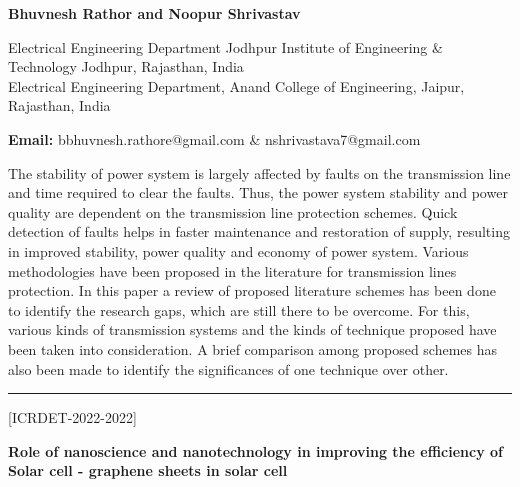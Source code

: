 \documentclass[twoside,11pt]{amsart}
\begin{document}
\centerline{\textbf{Bhuvnesh Rathor and Noopur Shrivastav }}
\vskip 5mm
\begin{flushleft}
Electrical Engineering Department
Jodhpur Institute of Engineering \& Technology Jodhpur, Rajasthan, India\\Electrical Engineering Department,
Anand College of Engineering, Jaipur, Rajasthan, India
\vskip 5mm
\end{flushleft}
\vskip 2mm
\begin{flushleft}
{\bf Email:} bbhuvnesh.rathore@gmail.com \& nshrivastava7@gmail.com
\end{flushleft}
\vskip 5mm
The stability of power system is largely affected by faults on the transmission line and time required to clear the faults. Thus, the power system stability and power quality are dependent on the transmission line protection schemes. Quick detection of faults helps in faster maintenance and restoration of supply, resulting in improved stability, power quality and economy of power system. Various methodologies have been proposed in the literature for transmission lines protection. In this paper a review of proposed literature schemes has been done to identify the research gaps, which are still there to be overcome. For this, various kinds of transmission systems and the kinds of technique proposed have been taken into consideration. A brief comparison among proposed schemes has also been made to identify the significances of one technique over other.
\vskip 2mm
\rule{\textwidth}{0.5pt}

\vskip 5mm
\begin{flushleft}
\centerline{[ICRDET-2022-2022]}
\end{flushleft}
\begin{center}\bf\LARGE
Role of nanoscience and nanotechnology in improving the efficiency of
Solar cell - graphene sheets in solar cell
\end{center}
\vskip 5mm
\end{document}
